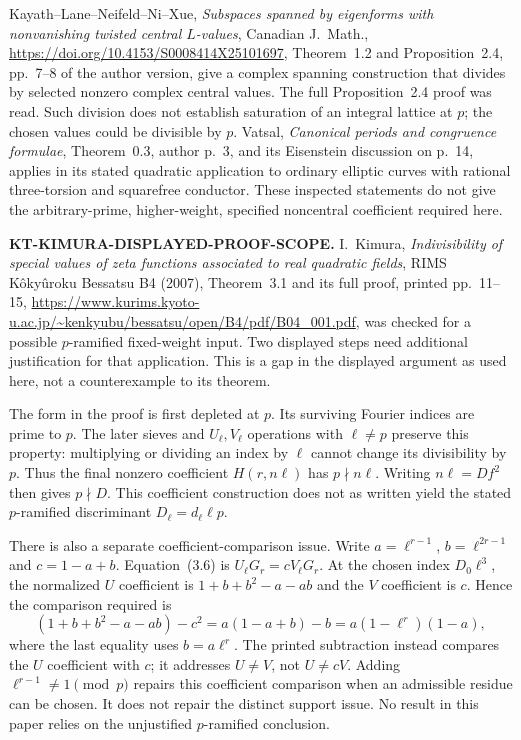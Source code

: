\documentclass[11pt,a4paper]{article}
\theoremstyle{definition}
\renewcommand{\paragraph}[1]{\par\smallskip\noindent\textbf{#1}\quad\ignorespaces}
\begin{document}
Kayath--Lane--Neifeld--Ni--Xue, \emph{Subspaces spanned by
eigenforms with nonvanishing twisted central $L$-values},
Canadian J.~Math.,
\url{https://doi.org/10.4153/S0008414X25101697},
Theorem~1.2 and Proposition~2.4, pp.~7--8 of the author
version, give a complex spanning construction that divides
by selected nonzero complex central values.  The full
Proposition~2.4 proof was read.  Such division does not
establish saturation of an integral lattice at $p$;
the chosen values could be divisible by $p$.  Vatsal,
\emph{Canonical periods and congruence formulae},
Theorem~0.3, author p.~3, and its Eisenstein discussion
on p.~14, applies in its stated quadratic application to
ordinary elliptic curves with rational three-torsion and
squarefree conductor.  These inspected statements do not
give the arbitrary-prime, higher-weight, specified
noncentral coefficient required here.

\paragraph{KT-KIMURA-DISPLAYED-PROOF-SCOPE.}
I.~Kimura, \emph{Indivisibility of special values of zeta
functions associated to real quadratic fields},
RIMS K\^oky\^uroku Bessatsu B4 (2007), Theorem~3.1
and its full proof, printed pp.~11--15,
\url{https://www.kurims.kyoto-u.ac.jp/~kenkyubu/bessatsu/open/B4/pdf/B04_001.pdf},
was checked for a possible $p$-ramified fixed-weight input.
Two displayed steps need additional justification for
that application.  This is a gap in the displayed
argument as used here, not a counterexample to its theorem.

The form in the proof is first depleted at $p$.
Its surviving Fourier indices are prime to $p$.
The later sieves and $U_\ell,V_\ell$ operations with
$\ell\ne p$ preserve this property: multiplying or
dividing an index by $\ell$ cannot change its divisibility
by $p$.  Thus the final nonzero coefficient $H(r,n\ell)$
has $p\nmid n\ell$.  Writing $n\ell=Df^2$ then gives
$p\nmid D$.  This coefficient construction does not as
written yield the stated $p$-ramified discriminant
$D_\ell=d_\ell\ell p$.

There is also a separate coefficient-comparison issue.
Write $a=\ell^{r-1}$, $b=\ell^{2r-1}$ and $c=1-a+b$.
Equation~(3.6) is $U_\ell G_r=cV_\ell G_r$.
At the chosen index $D_0\ell^3$, the normalized
$U$ coefficient is $1+b+b^2-a-ab$ and the
$V$ coefficient is $c$.  Hence the comparison required is
\[
 (1+b+b^2-a-ab)-c^2
   =a(1-a+b)-b
   =a(1-\ell^r)(1-a),
 \tag{KS.1}
\]
where the last equality uses $b=a\ell^r$.
The printed subtraction instead compares the $U$
coefficient with $c$; it addresses $U\ne V$, not
$U\ne cV$.  Adding $\ell^{r-1}\ne1\pmod p$
repairs this coefficient comparison when an admissible
residue can be chosen.  It does not repair the distinct
support issue.  No result in this paper relies on the
unjustified $p$-ramified conclusion.
\end{document}
